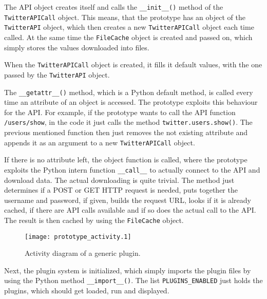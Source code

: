 \lstset{language=python}

The API object creates itself and calls the \texttt{\_\_init\_\_()} method of
the \texttt{TwitterAPICall} object. This means, that the prototype has an
object of the \texttt{TwitterAPI} object, which then creates a new
\texttt{TwitterAPICall} object each time called. At the same time the
\texttt{FileCache} object is created and passed on, which simply stores the
values downloaded into files.

When the \texttt{TwitterAPICall} object is created, it fills it default values,
with the one passed by the \texttt{TwitterAPI} object.

The \texttt{\_\_getattr\_\_()} method, which is a Python default method, is
called every time an attribute of an object is accessed. The prototype exploits
this behaviour for the \Twitter{} API. For example, if the prototype wants to
call the API function \texttt{/users/show}, in the code it just calls the
method \texttt{twitter.users.show()}. The previous mentioned function then just
removes the not existing attribute and appends it as an argument to a new
\texttt{TwitterAPICall} object.

If there is no attribute left, the object function is called, where the
prototype exploits the Python intern function \texttt{\_\_call\_\_} to actually
connect to the \Twitter{} API and download data. The actual downloading is
quite trivial. The method just determines if a POST or GET HTTP request
is needed, puts together the username and password, if given, builds the
request URL, looks if it is already cached, if there are API calls available
and if so does the actual call to the \Twitter{} API. The result is then cached
by using the \texttt{FileCache} object.

\begin{figure}[htb]
  \begin{center}
    \texttt{[image: prototype\_activity.1]}
    \caption{Activity diagram of a generic plugin.}
    \label{fig:prototype_activity}
  \end{center}
\end{figure}

Next, the plugin system is initialized, which simply imports the plugin files
by using the Python method \texttt{\_\_import\_\_()}. The list
\texttt{PLUGINS\_ENABLED} just holds the plugins, which should get loaded, run
and displayed.

